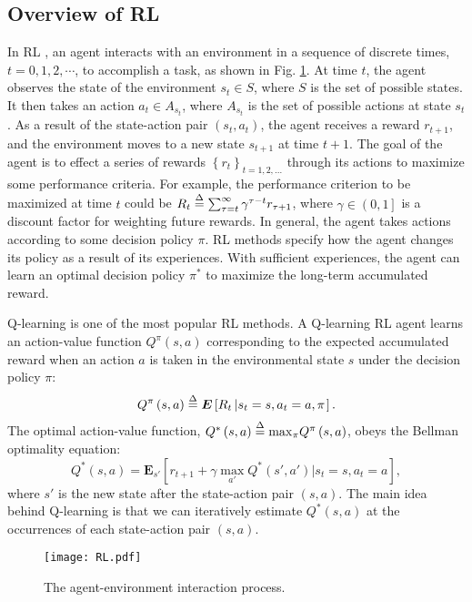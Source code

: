 \documentclass[journal,comsoc]{IEEEtran}
\begin{document}
\subsection{Overview of RL}\label{RLoverview}
In RL \cite{sutton1998reinforcement}, an agent interacts with an environment in a sequence of discrete times,  $ t=0,1,2, \cdots $, to accomplish a task, as shown in Fig. \ref{fig:RL}. At time $ t $, the agent observes the state of the environment  $ s_t \in S $, where $ S $ is the set of possible states. It then takes an action $ a_t \in A_{s_t} $,  where  $  A_{s_t} $ is the set of possible actions at state $ s_t $. As a result of the state-action pair $ \left( s_t, a_t\right)  $, the agent receives a reward $ r_{t+1} $, and the environment moves to a new state $ s_{t+1} $ at time  $ t+1 $. The goal of the agent is to effect a series of rewards  $ \left\lbrace r_t \right\rbrace_{t=1,2, ...}  $  through its actions to maximize some performance criteria. For example, the performance criterion to be maximized at time $ t $ could be $ {R_t} \buildrel \Delta \over = \sum\nolimits_{\tau  = t}^\infty  {{\gamma ^{\tau  - t}}{r_{\tau {\rm{ + }}1}}}  $, where $ \gamma \in \left( 0, 1\right]  $  is a discount factor for weighting future rewards. In general, the agent takes actions according to some decision policy  $ \pi $. RL methods specify how the agent changes its policy as a result of its experiences. With sufficient experiences, the agent can learn an optimal decision policy $ \pi^* $ to maximize the long-term accumulated reward\cite{sutton1998reinforcement}. 

Q-learning \cite{watkins1992q} is one of the most popular RL methods. A Q-learning RL agent learns an action-value function ${Q^\pi }(s,a)$ corresponding to the expected accumulated reward when an action $ a $ is taken in the environmental state $ s $ under the decision policy $ \pi $:
\begin{equation}
{Q^\pi }\left( {s,a} \right) \buildrel \Delta \over = \bm{E}\left[ {{R_t}\left| {{s_t} = s,{a_t} = a,\pi } \right.} \right].
\end{equation}
The optimal action-value function, $ {Q^ * }\left( {s,a} \right) \buildrel \Delta \over = {\max _\pi }{Q^\pi }\left( {s,a} \right) $, obeys the Bellman optimality equation\cite{sutton1998reinforcement}:
\begin{equation}
{Q^ * }\left( {s,a} \right) = {\bm{E}_{s'}}\left[ {{r_{t+1}} + \gamma \mathop {\max }\limits_{a'} {Q^*}\left( {s',a'} \right)| s_t=s ,a_t=a} \right],
\end{equation}
where $ s' $ is the new state after the state-action pair $ \left( s, a\right)  $. The main idea behind Q-learning is that we can iteratively estimate $ {Q^ * }\left( {s,a} \right) $ at the occurrences of each state-action pair $ \left( s, a\right)  $. 
\begin{figure}[!t]
	\centering
	\texttt{[image: RL.pdf]}
	\caption{The agent-environment interaction process.}
	\label{fig:RL}
\end{figure}
\end{document}
